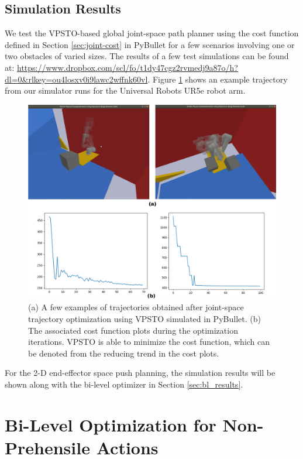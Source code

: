\subsection{Simulation Results}

We test the VPSTO-based global joint-space path planner using the cost function defined in Section \ref{sec:joint-cost} in PyBullet for a few scenarios involving one or two obstacles of varied sizes. The results of a few test simulations can be found at: \url{https://www.dropbox.com/scl/fo/t1dy47cgz2rvmedj9a87o/h?dl=0&rlkey=ou4losxv0i9lawc2wffnk60vl}. Figure \ref{fig:joint_traj_ur5} shows an example trajectory from our simulator runs for the Universal Robots UR5e robot arm. 

\begin{figure}[ht]
    \centering
    \includegraphics[scale=0.2]{figures/bl-manipulator/joint_trajs.png}
    \caption[Joint-space trajectories using VPSTO]{(a) A few examples of trajectories obtained after joint-space trajectory optimization using VPSTO simulated in PyBullet. (b) The associated cost function plots during the optimization iterations. VPSTO is able to minimize the cost function, which can be denoted from the reducing trend in the cost plots.}
    \label{fig:joint_traj_ur5}
\end{figure}

For the 2-D end-effector space push planning, the simulation results will be shown along with the bi-level optimizer in Section \ref{sec:bl_results}.


\section{Bi-Level Optimization for Non-Prehensile Actions}\label{sec:bi-level-method}

